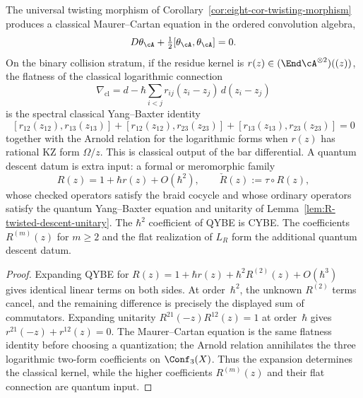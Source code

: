 \begin{proposition}
\label{prop:classical-cybe-quantum-r-input}
The universal twisting morphism of
Corollary~\ref{cor:eight-cor-twisting-morphism} produces a
classical Maurer--Cartan equation in the ordered convolution algebra,
\[
D\theta_\cA+\tfrac12[\theta_\cA,\theta_\cA]=0.
\]
On the binary collision stratum, if the residue kernel is
$r(z)\in(\End \cA^{\otimes 2})((z))$, the flatness of the classical
logarithmic connection
\[
\nabla_{\mathrm{cl}}
=d-\hbar\sum_{i<j}r_{ij}(z_i-z_j)\,d(z_i-z_j)
\]
is the spectral classical Yang--Baxter identity
\[
[r_{12}(z_{12}),r_{13}(z_{13})]
+[r_{12}(z_{12}),r_{23}(z_{23})]
+[r_{13}(z_{13}),r_{23}(z_{23})]=0
\]
together with the Arnold relation for the logarithmic forms when
$r(z)$ has rational KZ form $\Omega/z$. This is classical output of
the bar differential. A quantum descent datum is extra input: a
formal or meromorphic family
\[
R(z)=1+\hbar r(z)+O(\hbar^2),\qquad
\check R(z):=\tau\circ R(z),
\]
whose checked operators satisfy the braid cocycle and whose ordinary
operators satisfy the quantum Yang--Baxter equation and unitarity of
Lemma~\ref{lem:R-twisted-descent-unitary}.  The $\hbar^2$ coefficient
of QYBE is CYBE.  The coefficients $R^{(m)}(z)$ for $m\geq2$ and the
flat realization of $L_R$ form the additional quantum descent datum.
\end{proposition}

\begin{proof}
Expanding QYBE for
$R(z)=1+\hbar r(z)+\hbar^2R^{(2)}(z)+O(\hbar^3)$ gives identical
linear terms on both sides. At order~$\hbar^2$, the unknown
$R^{(2)}$ terms cancel, and the remaining difference is precisely
the displayed sum of commutators. Expanding unitarity
$R^{21}(-z)R^{12}(z)=1$ at order~$\hbar$ gives
$r^{21}(-z)+r^{12}(z)=0$. The Maurer--Cartan equation is the same
flatness identity before choosing a quantization; the Arnold relation
annihilates the three logarithmic two-form coefficients on
$\Conf_3(X)$.  Thus the expansion determines the classical kernel,
while the higher coefficients $R^{(m)}(z)$ and their flat connection
are quantum input.
\end{proof}

